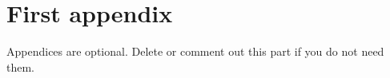 \documentclass[journal]{IEEEtran}
\begin{document}




\appendices
\section{First appendix}
Appendices are optional. Delete or comment out this part if you do not need them.


\end{document}
